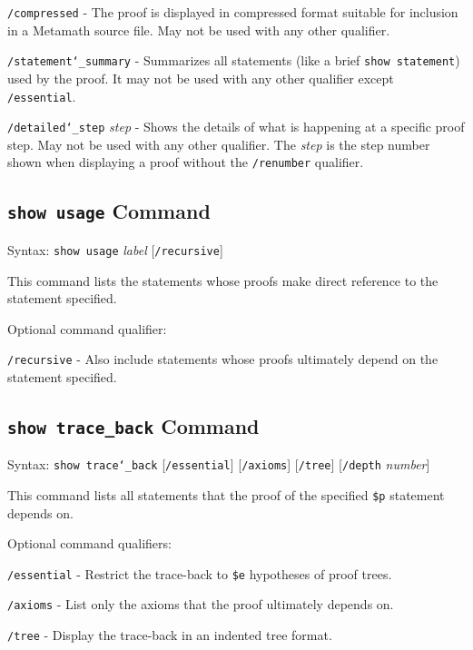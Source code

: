     \texttt{/compressed} - The proof is displayed in compressed format
        suitable for inclusion in a Metamath source file.  May not be used with
        any other qualifier.

    \texttt{/statement{\char`\_}summary} - Summarizes all statements (like a
        brief \texttt{show statement})
        used by the proof.  It may not be used with any other qualifier
        except \texttt{/essential}.

    \texttt{/detailed{\char`\_}step} {\em step} - Shows the details of what is
        happening at
        a specific proof step.  May not be used with any other qualifier.
        The {\em step} is the step number shown when displaying a
        proof without the \texttt{/renumber} qualifier.


\subsection{\texttt{show usage} Command}
Syntax:  \texttt{show usage} {\em label} [\texttt{/recursive}]

This command lists the statements whose proofs make direct reference to
the statement specified.

Optional command qualifier:

    \texttt{/recursive} - Also include statements whose proofs ultimately
        depend on the statement specified.



\subsection{\texttt{show trace\_back} Command}
Syntax:  \texttt{show trace{\char`\_}back} [\texttt{/essential}] [\texttt{/axioms}]
    [\texttt{/tree}] [\texttt{/depth} {\em number}]

This command lists all statements that the proof of the specified
\texttt{\$p} statement depends on.

Optional command qualifiers:

    \texttt{/essential} - Restrict the trace-back to \texttt{\$e}
         hypotheses of proof trees.

    \texttt{/axioms} - List only the axioms that the proof ultimately depends on.

    \texttt{/tree} - Display the trace-back in an indented tree format.

